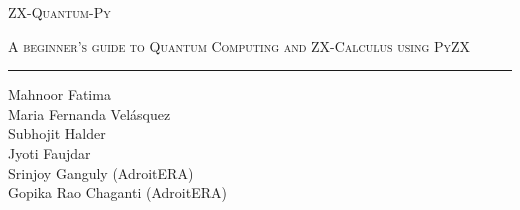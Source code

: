 
\newcommand{\thesisTitle}{ZX-Quantum-Py}
\newcommand{\thesisSubtitle}{A beginner's guide to Quantum Computing and ZX-Calculus using PyZX}
\newcommand{\credits}{30 hp}
\begin{titlepage}
\thispagestyle{empty}



\begin{comment}
\begin{tikzpicture}[overlay, remember picture]
\node[anchor=south west] 
     at (current page.south west)
      {\texttt{[image: Figures/recreational\_exp/experiment\_pics/led pattern.jpg]}};
\end{tikzpicture}
\end{comment}

\hspace{2cm}
\centering
\vspace{4cm}
\par
\noindent
\begin{Huge}
{\textsc{\thesisTitle}}\\
\end{Huge}
\vspace{0.6cm}
\begin{Large}
\textsc{\thesisSubtitle}\\
\end{Large}
\vspace{0.9cm}
\rule[0.3cm]{0.2\linewidth}{1pt}

\vspace{3cm}

\noindent
\Large

Mahnoor Fatima\\
Maria Fernanda Velásquez\\
Subhojit Halder\\
Jyoti Faujdar\\
Srinjoy Ganguly (AdroitERA)\\
Gopika Rao Chaganti (AdroitERA) 
\end{titlepage}
